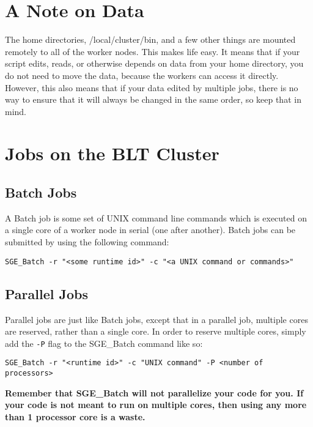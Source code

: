 \documentclass[]{book}
\begin{document}
\section{A Note on Data}\label{a-note-on-data}

The home directories, /local/cluster/bin, and a few other things are
mounted remotely to all of the worker nodes. This makes life easy. It
means that if your script edits, reads, or otherwise depends on data
from your home directory, you do not need to move the data, because the
workers can access it directly. However, this also means that if your
data edited by multiple jobs, there is no way to ensure that it will
always be changed in the same order, so keep that in mind.

\section{Jobs on the BLT Cluster}\label{jobs-on-the-blt-cluster}

\subsection{Batch Jobs}\label{batch-jobs}

A Batch job is some set of UNIX command line commands which is executed
on a single core of a worker node in serial (one after another). Batch
jobs can be submitted by using the following command:

\begin{verbatim}
SGE_Batch -r "<some runtime id>" -c "<a UNIX command or commands>"
\end{verbatim}

\subsection{Parallel Jobs}\label{parallel-jobs}

Parallel jobs are just like Batch jobs, except that in a parallel job,
multiple cores are reserved, rather than a single core. In order to
reserve multiple cores, simply add the \texttt{-P} flag to the
SGE\_Batch command like so:

\begin{verbatim}
SGE_Batch -r "<runtime id>" -c "UNIX command" -P <number of processors>
\end{verbatim}

\textbf{Remember that SGE\_Batch will not parallelize your code for you.
If your code is not meant to run on multiple cores, then using any more
than 1 processor core is a waste.}
\end{document}
